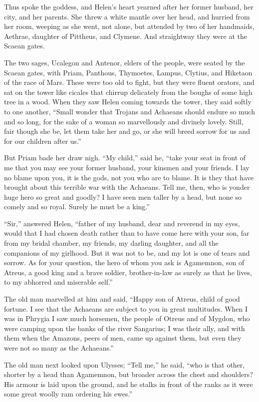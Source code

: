 Thus spoke the goddess, and Helen’s heart yearned after her former
husband, her city, and her parents. She threw a white mantle over her
head, and hurried from her room, weeping as she went, not alone, but
attended by two of her handmaids, Aethrae, daughter of Pittheus, and
Clymene. And straightway they were at the Scaean gates.

The two sages, Ucalegon and Antenor, elders of the people, were seated by
the Scaean gates, with Priam, Panthous, Thymoetes, Lampus, Clytius, and
Hiketaon of the race of Mars. These were too old to fight, but they were
fluent orators, and sat on the tower like cicales that chirrup delicately
from the boughs of some high tree in a wood. When they saw Helen coming
towards the tower, they said softly to one another, “Small wonder that
Trojans and Achaeans should endure so much and so long, for the sake of a
woman so marvellously and divinely lovely. Still, fair though she be, let
them take her and go, or she will breed sorrow for us and for our children
after us.”

But Priam bade her draw nigh. “My child,” said he, “take your seat in
front of me that you may see your former husband, your kinsmen and your
friends. I lay no blame upon you, it is the gods, not you who are to
blame. It is they that have brought about this terrible war with the
Achaeans. Tell me, then, who is yonder huge hero so great and goodly? I
have seen men taller by a head, but none so comely and so royal. Surely he
must be a king.”

“Sir,” answered Helen, “father of my husband, dear and reverend in my
eyes, would that I had chosen death rather than to have come here with
your son, far from my bridal chamber, my friends, my darling daughter, and
all the companions of my girlhood. But it was not to be, and my lot is one
of tears and sorrow. As for your question, the hero of whom you ask is
Agamemnon, son of Atreus, a good king and a brave soldier, brother-in-law
as surely as that he lives, to my abhorred and miserable self.”

The old man marvelled at him and said, “Happy son of Atreus, child of good
fortune. I see that the Achaeans are subject to you in great multitudes.
When I was in Phrygia I saw much horsemen, the people of Otreus and of
Mygdon, who were camping upon the banks of the river Sangarius; I was
their ally, and with them when the Amazons, peers of men, came up against
them, but even they were not so many as the Achaeans.”

The old man next looked upon Ulysses; “Tell me,” he said, “who is that
other, shorter by a head than Agamemnon, but broader across the chest and
shoulders? His armour is laid upon the ground, and he stalks in front of
the ranks as it were some great woolly ram ordering his ewes.”


